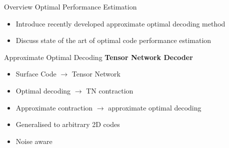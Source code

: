 \documentclass{dfki}
\begin{document}
\begin{frame}{Overview Optimal Performance Estimation}
	\begin{itemize}
		\item Introduce recently developed approximate optimal decoding method
		\pause
		\item Discuss state of the art of optimal code performance estimation
	\end{itemize}
\end{frame}

\begin{frame}{Approximate Optimal Decoding}
	\textbf{Tensor Network Decoder~}
		\begin{itemize}
			\item Surface Code $\rightarrow$ Tensor Network
			\pause
			\item Optimal decoding $\rightarrow$ TN contraction
			\item Approximate contraction $\rightarrow$ approximate optimal decoding
			\pause
			\item Generalised to arbitrary 2D codes 
			\item Noise aware~
		\end{itemize}
\end{frame}
\end{document}
